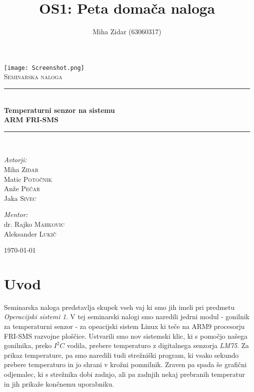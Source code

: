 \documentclass[10pt,a4paper]{article}
\author{Miha Zidar (63060317)}
\title{OS1: Peta domača naloga}
\begin{document}
\begin{titlepage}
\begin{center}

\texttt{[image: Screenshot.png]}\\[5.0cm]    
\textsc{\Large Seminarska naloga}\\[1.5cm]

\hrule \ \\[0.2cm]
{ \huge \bfseries Temperaturni senzor na sistemu \\ ARM  FRI-SMS}\\[0.5cm]
\hrule \ \\[2.5cm]

\begin{minipage}{0.4\textwidth}
\begin{flushleft} \large
\emph{Avtorji:}\\
Miha \textsc{Zidar}\\
Matic \textsc{Potočnik}\\
Anže \textsc{Pečar}\\
Jaka \textsc{Sivec}\\
\end{flushleft}
\end{minipage}
\begin{minipage}{0.4\textwidth}
\begin{flushright} \large
\emph{Mentor:} \\
dr. Rajko  \textsc{Mahkovic}\\
Aleksander   \textsc{Lukič}
\end{flushright}
\end{minipage}
\vfill

{\large \today}

\end{center}
\end{titlepage}

\tableofcontents
\newpage 

\section{Uvod}
Seminarska naloga predstavlja skupek vseh vaj ki smo jih imeli pri predmetu \emph{Operacijski sistemi 1}. V tej seminarski nalogi smo naredili jedrni modul - gonilnik za temperaturni senzor - za opeacijski sistem Linux ki teče na ARM9 procesorju FRI-SMS razvojne ploščice. Ustvarili smo nov sistemski klic, ki s pomočjo našega gonilnika, preko $I^2C$ vodila, prebere temperaturo z digitalnega senzorja \emph{LM75}. Za prikaz temperature, pa smo naredili tudi strežniški program, ki vsako sekundo prebere temperaturo in jo shrani v krožni pomnilnik. Zraven pa spada še grafični odjemalec, ki s strežnika dobi zadnjo, ali pa zadnjih nekaj prebranih temperatur in jih prikaže končnemu uporabniku. \\
\end{document}
